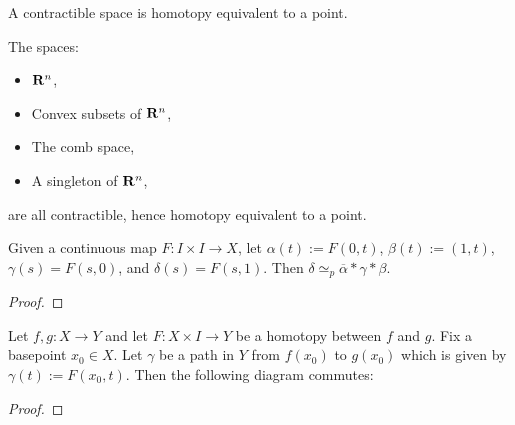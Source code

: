 \begin{example}
	A contractible space is homotopy equivalent to a point.
\end{example}

\begin{example}
	The spaces:
	\begin{itemize}[itemsep=1pt,topsep=3pt]
		\item $\mathbf{R}^n$,
		\item Convex subsets of  $\mathbf{R}^n$,
		\item The comb space,
		\item A singleton of $\mathbf{R}^n$,
	\end{itemize}
	are all contractible, hence homotopy equivalent to a point.
\end{example}

{\color{red}\begin{example}
	
\end{example}}

\begin{lemma}
	Given a continuous map $F:I \times I \rightarrow X$, let  $\alpha(t):= F(0,t)$,  $\beta(t):=(1,t)$,  $\gamma(s) = F(s,0)$, and $\delta(s) = F(s,1)$. Then  $\delta \simeq_p \overline{\alpha}\ast\gamma \ast \beta$.
\end{lemma}
{\color{red}\begin{proof}
	
\end{proof}}

\begin{lemma}\label{lemma:homotopy-commutative-diagram}
	Let $f,g:X \rightarrow Y$ and let  $F:X \times I \rightarrow Y$ be a homotopy between  $f$ and  $g$. Fix a basepoint  $x_0 \in X$. Let $\gamma$ be a path in  $Y$ from  $f(x_0)$ to $g(x_0)$ which is given by $\gamma(t) := F(x_0,t)$. Then the following diagram commutes:
	\begin{center}
	\end{center}
\end{lemma}

{\color{red} \begin{proof}
	
\end{proof}}

